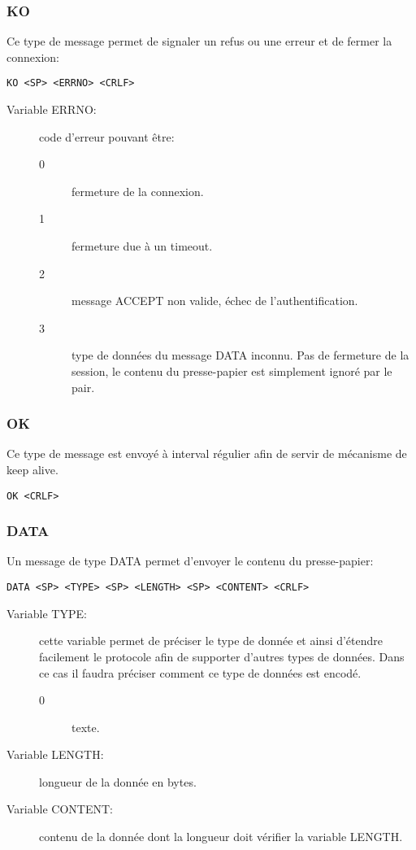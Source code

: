 \hrulefill

\subsubsection*{KO}
Ce type de message permet de signaler un refus ou une erreur et de fermer
la connexion:
\begin{verbatim}
KO <SP> <ERRNO> <CRLF>
\end{verbatim}
\begin{description}
\item[Variable ERRNO:] code d'erreur pouvant être:
  \begin{description}
  \item[0] fermeture de la connexion.
  \item[1] fermeture due à un timeout.
  \item[2] message ACCEPT non valide, échec de l'authentification.
  \item[3] type de données du message DATA inconnu. Pas de fermeture de la
    session, le contenu du presse-papier est simplement ignoré par le pair.
  \end{description}
\end{description}

\hrulefill

\subsubsection*{OK}
Ce type de message est envoyé à interval régulier afin de servir de mécanisme
de keep alive.
\begin{verbatim}
OK <CRLF>
\end{verbatim}

\hrulefill

\subsubsection*{DATA}
Un message de type DATA permet d'envoyer le contenu du presse-papier:
\begin{verbatim}
DATA <SP> <TYPE> <SP> <LENGTH> <SP> <CONTENT> <CRLF>
\end{verbatim}
\begin{description}
\item[Variable TYPE:] cette variable permet de préciser le type
  de donnée et ainsi d'étendre facilement le protocole afin de supporter
  d'autres types de données. Dans ce cas il faudra préciser comment ce type
  de données est encodé.
  \begin{description}
  \item[0] texte.
  \end{description}
\item[Variable LENGTH:] longueur de la donnée en bytes.
\item[Variable CONTENT:] contenu de la donnée dont la longueur
  doit vérifier la variable LENGTH.
\end{description}

